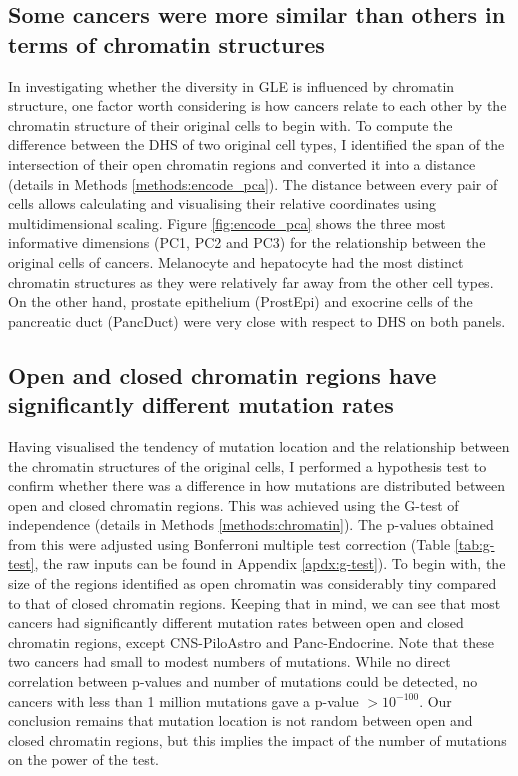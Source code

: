 \subsection{Some cancers were more similar than others in terms of chromatin structures}\label{gle:pca}
In investigating whether the diversity in GLE is influenced by chromatin structure, one factor worth considering is how cancers relate to each other by the chromatin structure of their original cells to begin with. To compute the difference between the DHS of two original cell types, I identified the span of the intersection of their open chromatin regions and converted it into a distance (details in Methods \ref{methods:encode_pca}). The distance between every pair of cells allows calculating and visualising their relative coordinates using multidimensional scaling. Figure \ref{fig:encode_pca} shows the three most informative dimensions (PC1, PC2 and PC3) for the relationship between the original cells of cancers. Melanocyte and hepatocyte had the most distinct chromatin structures as they were relatively far away from the other cell types. On the other hand, prostate epithelium (ProstEpi) and exocrine cells of the pancreatic duct (PancDuct) were very close with respect to DHS on both panels.



\subsection{Open and closed chromatin regions have significantly different mutation rates}\label{gle:g}
Having visualised the tendency of mutation location and the relationship between the chromatin structures of the original cells, I performed a hypothesis test to confirm whether there was a difference in how mutations are distributed between open and closed chromatin regions. This was achieved using the G-test of independence (details in Methods \ref{methods:chromatin}). The p-values obtained from this were adjusted using Bonferroni multiple test correction (Table \ref{tab:g-test}, the raw inputs can be found in Appendix \ref{apdx:g-test}). To begin with, the size of the regions identified as open chromatin was considerably tiny compared to that of closed chromatin regions. Keeping that in mind, we can see that most cancers had significantly different mutation rates between open and closed chromatin regions, except CNS-PiloAstro and Panc-Endocrine. Note that these two cancers had small to modest numbers of mutations. While no direct correlation between p-values and number of mutations could be detected, no cancers with less than 1 million mutations gave a p-value $>10^{-100}$. Our conclusion remains that mutation location is not random between open and closed chromatin regions, but this implies the impact of the number of mutations on the power of the test. 

